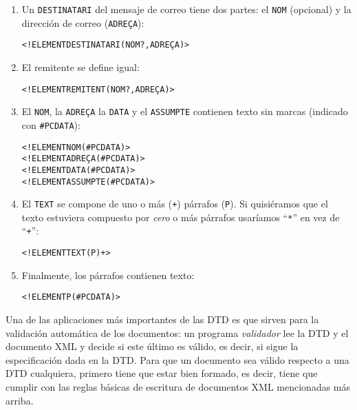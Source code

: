 \begin{enumerate}
\item Un \texttt{DESTINATARI} del mensaje de correo tiene dos partes: el \texttt{NOM} (opcional) y la dirección de correo (\texttt{ADREÇA}): \begin{small}\begin{alltt} <!ELEMENT DESTINATARI (NOM?, ADREÇA)> \end{alltt}\end{small} \item El remitente se define igual: \begin{small}\begin{alltt} <!ELEMENT REMITENT (NOM?, ADREÇA)> \end{alltt}\end{small} \item El \texttt{NOM}, la \texttt{ADREÇA} la \texttt{DATA} y el \texttt{ASSUMPTE} contienen texto sin marcas (indicado con \texttt{\#PCDATA}): 
\begin{small}\begin{alltt} 
<!ELEMENT NOM (#PCDATA)> 
<!ELEMENT ADREÇA (#PCDATA)> 
<!ELEMENT DATA (#PCDATA)> 
<!ELEMENT ASSUMPTE (#PCDATA)> \end{alltt}\end{small} 

\item El \texttt{TEXT} se compone de uno o más (\texttt{+}) párrafos (\texttt{P}). Si quisiéramos que el texto estuviera compuesto por \emph{cero} o más párrafos usaríamos ``\texttt{*}'' en vez de ``\texttt{+}'': \begin{small}\begin{alltt} <!ELEMENT TEXT (P)+> \end{alltt}\end{small} 

\item Finalmente, los párrafos contienen texto: \begin{small}\begin{alltt} <!ELEMENT P (#PCDATA)> \end{alltt}\end{small} \end{enumerate} 

Una de las aplicaciones más importantes de las DTD es que sirven para la validación automática de los documentos: un programa \emph{validador} lee la DTD y el documento XML y decide si este último es válido, es decir, si sigue la especificación dada en la DTD. Para que un documento sea válido respecto a una DTD cualquiera, primero tiene que estar bien formado, es decir, tiene que cumplir con las reglas básicas de escritura de documentos XML mencionadas más arriba. 

